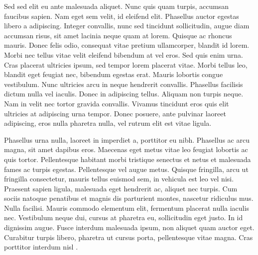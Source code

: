 \documentclass[bsc, classic, a4paper]{ufbathesis}
\begin{document}
Sed sed elit eu ante malesuada aliquet. Nunc quis quam turpis, accumsan faucibus sapien. Nam eget sem velit, id eleifend elit. Phasellus auctor egestas libero a adipiscing. Integer convallis, nunc sed tincidunt sollicitudin, augue diam accumsan risus, sit amet lacinia neque quam at lorem. Quisque ac rhoncus mauris. Donec felis odio, consequat vitae pretium ullamcorper, blandit id lorem. Morbi nec tellus vitae velit eleifend bibendum at vel eros. Sed quis enim urna. Cras placerat ultricies ipsum, sed tempor lorem placerat vitae. Morbi tellus leo, blandit eget feugiat nec, bibendum egestas erat. Mauris lobortis congue vestibulum. Nunc ultricies arcu in neque hendrerit convallis. Phasellus facilisis dictum nulla vel iaculis. Donec in adipiscing tellus. Aliquam non turpis neque. Nam in velit nec tortor gravida convallis. Vivamus tincidunt eros quis elit ultricies at adipiscing urna tempor. Donec posuere, ante pulvinar laoreet adipiscing, eros nulla pharetra nulla, vel rutrum elit est vitae ligula.

Phasellus urna nulla, laoreet in imperdiet a, porttitor eu nibh. Phasellus ac arcu magna, sit amet dapibus eros. Maecenas eget metus vitae leo feugiat lobortis ac quis tortor. Pellentesque habitant morbi tristique senectus et netus et malesuada fames ac turpis egestas. Pellentesque vel augue metus. Quisque fringilla, arcu ut fringilla consectetur, mauris tellus euismod sem, in vehicula est leo vel nisi. Praesent sapien ligula, malesuada eget hendrerit ac, aliquet nec turpis. Cum sociis natoque penatibus et magnis dis parturient montes, nascetur ridiculus mus. Nulla facilisi. Mauris commodo elementum elit, fermentum placerat nulla iaculis nec. Vestibulum neque dui, cursus at pharetra eu, sollicitudin eget justo. In id dignissim augue. Fusce interdum malesuada ipsum, non aliquet quam auctor eget. Curabitur turpis libero, pharetra ut cursus porta, pellentesque vitae magna. Cras porttitor interdum nisl \cite{raymond1999}.


\backmatter

\appendix

% 
% 
% 






\end{document}
